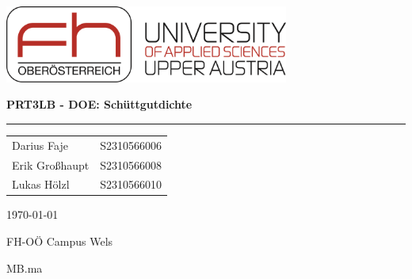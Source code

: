\documentclass[liststotoc, bibtotoc, pointlessnumbers, a4paper,
12pt]{scrreport}
\begin{document}
	\begin{titlepage}
		\centering
		\includegraphics[width=0.7\textwidth]{FH.png}\par
		\vspace{2.5cm}
		\Huge\textbf{PRT3LB - DOE: Schüttgutdichte}\par
		\vspace{1cm}
		\hrule
		\vspace{2cm}
		\begin{center}
			\begin{tabular}{ll}
				\large Darius Faje			&	\large S2310566006	\\
				\large Erik Großhaupt		&	\large S2310566008	\\
				\large Lukas Hölzl			&	\large S2310566010	\\	
			\end{tabular}
		\end{center}\par
		\vspace{2 cm}
		\large\today\par
		\large FH-OÖ Campus Wels \par
		\large MB.ma \par
	\end{titlepage}
	\newpage
	\tableofcontents
	\newpage
	\clearpage
	
	
	
	
	
	\clearpage
	
	\clearpage
	
	\clearpage
	
\end{document}
